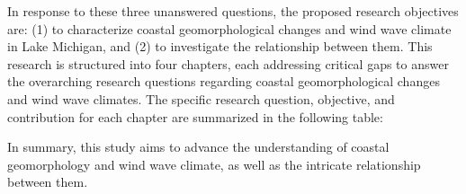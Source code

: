In response to these three unanswered questions, the proposed research objectives are: (1) to characterize coastal geomorphological changes and wind wave climate in Lake Michigan, and (2) to investigate the relationship between them. This research is structured into four chapters, each addressing critical gaps to answer the overarching research questions regarding coastal geomorphological changes and wind wave climates. The specific research question, objective, and contribution for each chapter are summarized in the following table:



In summary, this study aims to advance the understanding of coastal geomorphology and wind wave climate, as well as the intricate relationship between them.
